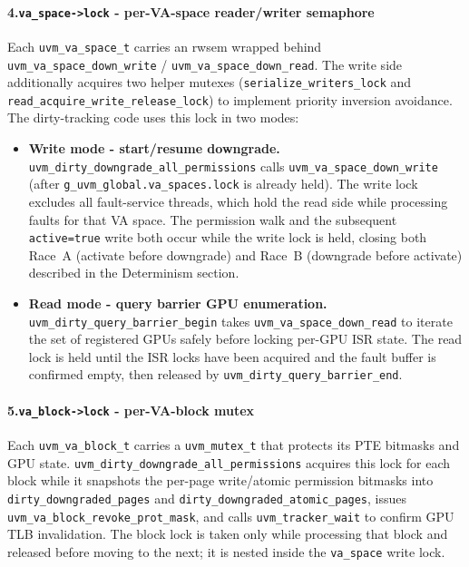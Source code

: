 \paragraph{4.\enspace\texttt{va\_space->lock} - per-VA-space reader/writer semaphore}

Each \texttt{uvm\_va\_space\_t} carries an rwsem wrapped behind
\texttt{uvm\_va\_space\_down\_write} / \texttt{uvm\_va\_space\_down\_read}.
The write side additionally acquires two helper mutexes
(\texttt{serialize\_writers\_lock} and \texttt{read\_acquire\_write\_release\_lock})
to implement priority inversion avoidance.
The dirty-tracking code uses this lock in two modes:

\begin{itemize}
    \item \textbf{Write mode - start/resume downgrade.}
          \texttt{uvm\_dirty\_downgrade\_all\_permissions} calls
          \texttt{uvm\_va\_space\_down\_write} (after
          \texttt{g\_uvm\_global.va\_spaces.lock} is already held).
          The write lock excludes all fault-service threads, which hold the
          read side while processing faults for that VA space.
          The permission walk and the subsequent \texttt{active=true} write
          both occur while the write lock is held, closing both Race~A
          (activate before downgrade) and Race~B (downgrade before activate)
          described in the Determinism section.

    \item \textbf{Read mode - query barrier GPU enumeration.}
          \texttt{uvm\_dirty\_query\_barrier\_begin} takes
          \texttt{uvm\_va\_space\_down\_read} to iterate the set of registered
          GPUs safely before locking per-GPU ISR state.
          The read lock is held until the ISR locks have been acquired and the
          fault buffer is confirmed empty, then released by
          \texttt{uvm\_dirty\_query\_barrier\_end}.
\end{itemize}

\paragraph{5.\enspace\texttt{va\_block->lock} - per-VA-block mutex}

Each \texttt{uvm\_va\_block\_t} carries a \texttt{uvm\_mutex\_t} that
protects its PTE bitmasks and GPU state.
\texttt{uvm\_dirty\_downgrade\_all\_permissions} acquires this lock for each
block while it snapshots the per-page write/atomic permission bitmasks into
\texttt{dirty\_downgraded\_pages} and
\texttt{dirty\_downgraded\_atomic\_pages}, issues
\texttt{uvm\_va\_block\_revoke\_prot\_mask}, and calls
\texttt{uvm\_tracker\_wait} to confirm GPU TLB invalidation.
The block lock is taken only while processing that block and released before
moving to the next; it is nested inside the \texttt{va\_space} write lock.

